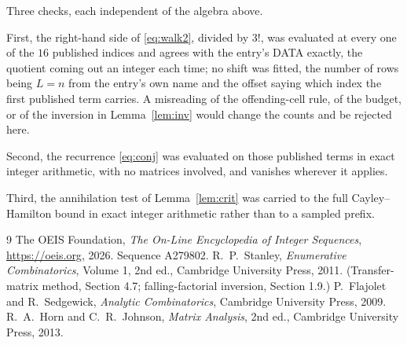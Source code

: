 \documentclass[11pt,a4paper]{article}
\theoremstyle{plain}
\theoremstyle{definition}
\begin{document}
Three checks, each independent of the algebra above.

First, the right-hand side of \eqref{eq:walk2}, divided by $3!$, was evaluated at every
one of the $16$ published indices and agrees with the entry's DATA exactly, the quotient
coming out an integer each time; no shift was fitted, the number of rows being
$L=n$ from the entry's own name and the offset saying which index the first published
term carries. A misreading of the offending-cell rule, of the budget, or of the inversion in
Lemma~\ref{lem:inv} would change the counts and be rejected here.

Second, the recurrence \eqref{eq:conj} was evaluated on those published terms in exact
integer arithmetic, with no matrices involved, and vanishes wherever it applies.

Third, the annihilation test of Lemma~\ref{lem:crit} was carried to the full
Cayley--Hamilton bound in exact integer arithmetic rather than to a sampled prefix.

\begin{thebibliography}{9}
 The OEIS Foundation, \emph{The On-Line Encyclopedia of Integer
Sequences}, \url{https://oeis.org}, 2026. Sequence A279802.
 R.~P.~Stanley, \emph{Enumerative Combinatorics}, Volume 1, 2nd ed.,
Cambridge University Press, 2011. (Transfer-matrix method, Section 4.7; falling-factorial
inversion, Section 1.9.)
 P.~Flajolet and R.~Sedgewick, \emph{Analytic Combinatorics}, Cambridge
University Press, 2009.
 R.~A.~Horn and C.~R.~Johnson, \emph{Matrix Analysis}, 2nd ed., Cambridge
University Press, 2013.
\end{thebibliography}
\end{document}
